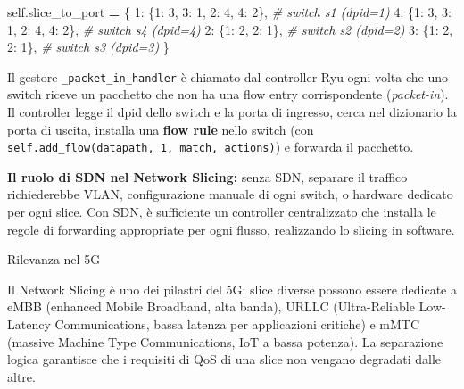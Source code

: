 \documentclass[
  italian,
  openany]{book}
\newenvironment{Shaded}{\begin{snugshade}}{\end{snugshade}}
\newcommand{\CommentTok}[1]{\textcolor[rgb]{0.56,0.35,0.01}{\textit{#1}}}
\newcommand{\DecValTok}[1]{\textcolor[rgb]{0.00,0.00,0.81}{#1}}
\newcommand{\NormalTok}[1]{#1}
\newcommand{\OperatorTok}[1]{\textcolor[rgb]{0.81,0.36,0.00}{\textbf{#1}}}
\newcommand{\VariableTok}[1]{\textcolor[rgb]{0.00,0.00,0.00}{#1}}
\begin{document}
\begin{Shaded}
\begin{Highlighting}[]
\VariableTok{self}\NormalTok{.slice\_to\_port }\OperatorTok{=}\NormalTok{ \{}
    \DecValTok{1}\NormalTok{: \{}\DecValTok{1}\NormalTok{: }\DecValTok{3}\NormalTok{, }\DecValTok{3}\NormalTok{: }\DecValTok{1}\NormalTok{, }\DecValTok{2}\NormalTok{: }\DecValTok{4}\NormalTok{, }\DecValTok{4}\NormalTok{: }\DecValTok{2}\NormalTok{\},  }\CommentTok{\# switch s1 (dpid=1)}
    \DecValTok{4}\NormalTok{: \{}\DecValTok{1}\NormalTok{: }\DecValTok{3}\NormalTok{, }\DecValTok{3}\NormalTok{: }\DecValTok{1}\NormalTok{, }\DecValTok{2}\NormalTok{: }\DecValTok{4}\NormalTok{, }\DecValTok{4}\NormalTok{: }\DecValTok{2}\NormalTok{\},  }\CommentTok{\# switch s4 (dpid=4)}
    \DecValTok{2}\NormalTok{: \{}\DecValTok{1}\NormalTok{: }\DecValTok{2}\NormalTok{, }\DecValTok{2}\NormalTok{: }\DecValTok{1}\NormalTok{\},               }\CommentTok{\# switch s2 (dpid=2)}
    \DecValTok{3}\NormalTok{: \{}\DecValTok{1}\NormalTok{: }\DecValTok{2}\NormalTok{, }\DecValTok{2}\NormalTok{: }\DecValTok{1}\NormalTok{\},               }\CommentTok{\# switch s3 (dpid=3)}
\NormalTok{\}}
\end{Highlighting}
\end{Shaded}

Il gestore \texttt{\_packet\_in\_handler} è chiamato dal controller Ryu
ogni volta che uno switch riceve un pacchetto che non ha una flow entry
corrispondente (\emph{packet-in}). Il controller legge il dpid dello
switch e la porta di ingresso, cerca nel dizionario la porta di uscita,
installa una \textbf{flow rule} nello switch (con
\texttt{self.add\_flow(datapath,\ 1,\ match,\ actions)}) e forwarda il
pacchetto.

\textbf{Il ruolo di SDN nel Network Slicing:} senza SDN, separare il
traffico richiederebbe VLAN, configurazione manuale di ogni switch, o
hardware dedicato per ogni slice. Con SDN, è sufficiente un controller
centralizzato che installa le regole di forwarding appropriate per ogni
flusso, realizzando lo slicing in software.

\begin{callouttip}{Rilevanza nel 5G}

Il Network Slicing è uno dei pilastri del 5G: slice diverse possono
essere dedicate a eMBB (enhanced Mobile Broadband, alta banda), URLLC
(Ultra-Reliable Low-Latency Communications, bassa latenza per
applicazioni critiche) e mMTC (massive Machine Type Communications, IoT
a bassa potenza). La separazione logica garantisce che i requisiti di
QoS di una slice non vengano degradati dalle altre.

\end{callouttip}
\end{document}
